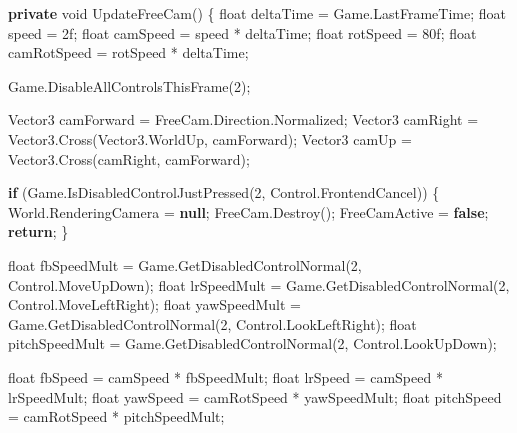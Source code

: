 \documentclass[
  openany]{book}
\newenvironment{Shaded}{\begin{snugshade}}{\end{snugshade}}
\newcommand{\DataTypeTok}[1]{\textcolor[rgb]{0.13,0.29,0.53}{#1}}
\newcommand{\DecValTok}[1]{\textcolor[rgb]{0.00,0.00,0.81}{#1}}
\newcommand{\FunctionTok}[1]{\textcolor[rgb]{0.00,0.00,0.00}{#1}}
\newcommand{\KeywordTok}[1]{\textcolor[rgb]{0.13,0.29,0.53}{\textbf{#1}}}
\newcommand{\NormalTok}[1]{#1}
\begin{document}
\begin{Shaded}
\begin{Highlighting}[]
        \KeywordTok{private} \DataTypeTok{void} \FunctionTok{UpdateFreeCam}\NormalTok{()}
\NormalTok{        \{}
            \DataTypeTok{float}\NormalTok{ deltaTime = Game.}\FunctionTok{LastFrameTime}\NormalTok{;}
            \DataTypeTok{float}\NormalTok{ speed = 2f;}
            \DataTypeTok{float}\NormalTok{ camSpeed = speed * deltaTime;}
            \DataTypeTok{float}\NormalTok{ rotSpeed = 80f;}
            \DataTypeTok{float}\NormalTok{ camRotSpeed = rotSpeed * deltaTime;}

\NormalTok{            Game.}\FunctionTok{DisableAllControlsThisFrame}\NormalTok{(}\DecValTok{2}\NormalTok{);}

\NormalTok{            Vector3 camForward = FreeCam.}\FunctionTok{Direction}\NormalTok{.}\FunctionTok{Normalized}\NormalTok{; }
\NormalTok{            Vector3 camRight = Vector3.}\FunctionTok{Cross}\NormalTok{(Vector3.}\FunctionTok{WorldUp}\NormalTok{, camForward); }
\NormalTok{            Vector3 camUp = Vector3.}\FunctionTok{Cross}\NormalTok{(camRight, camForward);}

            \KeywordTok{if}\NormalTok{ (Game.}\FunctionTok{IsDisabledControlJustPressed}\NormalTok{(}\DecValTok{2}\NormalTok{, Control.}\FunctionTok{FrontendCancel}\NormalTok{))}
\NormalTok{            \{}
\NormalTok{                World.}\FunctionTok{RenderingCamera}\NormalTok{ = }\KeywordTok{null}\NormalTok{;}
\NormalTok{                FreeCam.}\FunctionTok{Destroy}\NormalTok{();}
\NormalTok{                FreeCamActive = }\KeywordTok{false}\NormalTok{;}
                \KeywordTok{return}\NormalTok{;}
\NormalTok{            \}}

            \DataTypeTok{float}\NormalTok{ fbSpeedMult = Game.}\FunctionTok{GetDisabledControlNormal}\NormalTok{(}\DecValTok{2}\NormalTok{, Control.}\FunctionTok{MoveUpDown}\NormalTok{);}
            \DataTypeTok{float}\NormalTok{ lrSpeedMult = Game.}\FunctionTok{GetDisabledControlNormal}\NormalTok{(}\DecValTok{2}\NormalTok{, Control.}\FunctionTok{MoveLeftRight}\NormalTok{);}
            \DataTypeTok{float}\NormalTok{ yawSpeedMult = Game.}\FunctionTok{GetDisabledControlNormal}\NormalTok{(}\DecValTok{2}\NormalTok{, Control.}\FunctionTok{LookLeftRight}\NormalTok{);}
            \DataTypeTok{float}\NormalTok{ pitchSpeedMult = Game.}\FunctionTok{GetDisabledControlNormal}\NormalTok{(}\DecValTok{2}\NormalTok{, Control.}\FunctionTok{LookUpDown}\NormalTok{);}

            \DataTypeTok{float}\NormalTok{ fbSpeed = camSpeed * fbSpeedMult;}
            \DataTypeTok{float}\NormalTok{ lrSpeed = camSpeed * lrSpeedMult;}
            \DataTypeTok{float}\NormalTok{ yawSpeed = camRotSpeed * yawSpeedMult;}
            \DataTypeTok{float}\NormalTok{ pitchSpeed = camRotSpeed * pitchSpeedMult;}


\end{Highlighting}
\end{Shaded}
\end{document}
